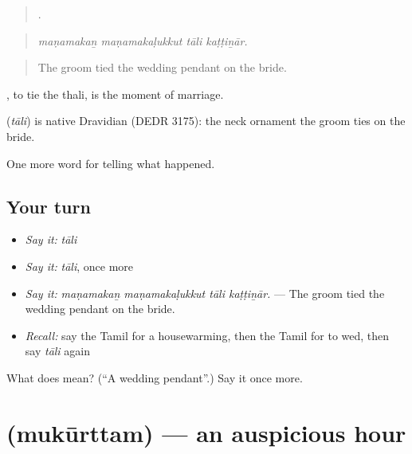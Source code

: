 \begin{quote}
   .
\end{quote}

\begin{quote}
\emph{maṇamakaṉ maṇamakaḷukkut tāli kaṭṭiṉār.}
\end{quote}

\begin{quote}
The groom tied the wedding pendant on the bride.
\end{quote}

 , to tie the thali, is the moment of marriage.

\begin{cousinweb}
\textbf{} (\emph{tāli}) is native Dravidian (DEDR 3175): the neck ornament the groom ties on the bride.
\end{cousinweb}

\begin{grammarlens}[title={What you've built}]
One more word for telling what happened.
\end{grammarlens}

\subsection*{Your turn}
\begin{itemize}
\raggedright
  \item \emph{Say it:} \emph{tāli}
  \item \emph{Say it:} \emph{tāli}, once more
  \item \emph{Say it:} \emph{maṇamakaṉ maṇamakaḷukkut tāli kaṭṭiṉār.} — The groom tied the wedding pendant on the bride.
  \item \emph{Recall:} say the Tamil for a housewarming, then the Tamil for to wed, then say \emph{tāli} again
\end{itemize}

\begin{tcolorbox}[breakable,colback=teal!4,colframe=teal!35!black,title={Before you move on}]
What does  mean? (\textquotedblleft{}A wedding pendant\textquotedblright{}.) Say it once more.
\end{tcolorbox}
\section[\texorpdfstring{\ta{முகூர்த்தம்} (mukūrttam)}{முகூர்த்தம் (mukūrttam)}]{ (mukūrttam) — an auspicious hour}

